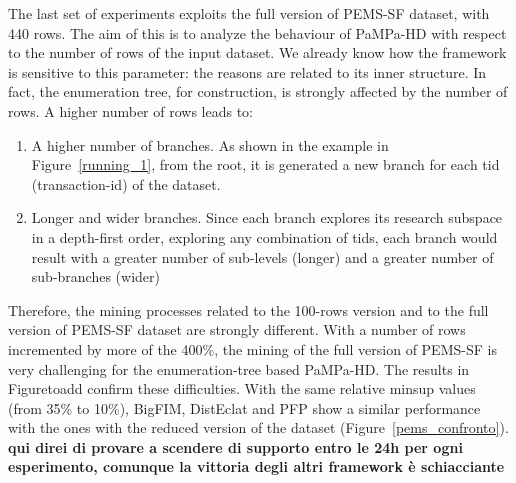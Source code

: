 The last set of experiments exploits the full version of PEMS-SF dataset, with 440 rows.
The aim of this is to analyze the behaviour of PaMPa-HD with respect to the number of rows of the input dataset. We already know how the framework is sensitive to this parameter: the reasons are related to its inner structure. In fact, the enumeration tree, for construction, is strongly affected by the number of rows. A higher number of rows leads to:
\begin{enumerate}
\item A higher number of branches. As shown in the example in Figure~\ref{running_1}, from the root, it is generated a new branch for each tid (transaction-id) of the dataset.
\item Longer and wider branches. Since each branch explores its research subspace in a depth-first order, exploring any combination of tids, each branch would result with a greater number of sub-levels (longer) and a greater number of sub-branches (wider)
\end{enumerate}
Therefore, the mining processes related to the 100-rows version and to the full version of PEMS-SF dataset are strongly different. With a number of rows incremented by more of the 400\%, the mining of the full version of PEMS-SF is very challenging for the enumeration-tree based PaMPa-HD.
The results in Figuretoadd confirm these difficulties. With the same relative minsup values (from 35\% to 10\%), BigFIM, DistEclat and PFP show a similar performance with the ones with the reduced version of the dataset (Figure~\ref{pems_confronto}).
\textbf{qui direi di provare a scendere di supporto entro le 24h per ogni esperimento, comunque la vittoria degli altri framework è schiacciante}

%


